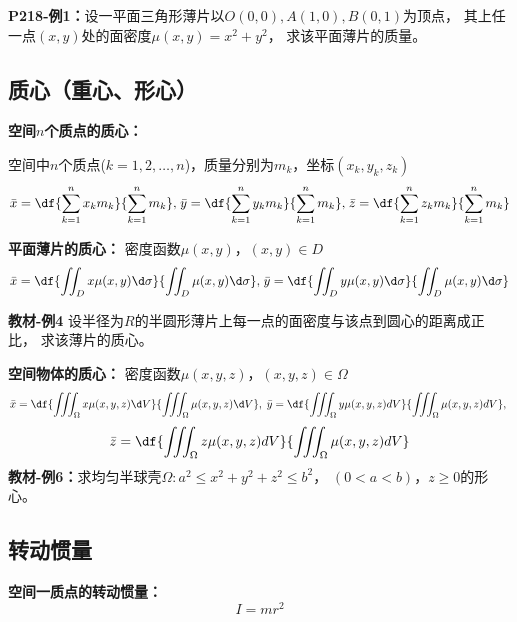 {\bf P218-例1：}设一平面三角形薄片以$O(0,0),A(1,0),B(0,1)$为顶点，
其上任一点$(x,y)$处的面密度$\mu(x,y)=x^2+y^2$，
求该平面薄片的质量。

\subsection{质心（重心、形心）}

{\bf 空间$n$个质点的质心：}
	
空间中$n$个质点($k=1,2,\ldots,n$)，质量分别为$m_k$，坐标$(x_k,y_k,z_k)$
$${\bar{x}=\df{\sum\limits_{k=1}^nx_km_k}{\sum\limits_{k=1}^nm_k},}\;
{\bar{y}=\df{\sum\limits_{k=1}^ny_km_k}{\sum\limits_{k=1}^nm_k},}\; 
{\bar{z}=\df{\sum\limits_{k=1}^nz_km_k}{\sum\limits_{k=1}^nm_k}}$$

{\bf 平面薄片的质心：} 密度函数$\mu(x,y)$，$(x,y)\in D$
$${\bar{x}=\df{\displaystyle\iint_Dx\mu(x,y)\d\sigma}
{\displaystyle\iint_D\mu(x,y)\d\sigma},\;} 
{\bar{y}=\df{\displaystyle\iint_Dy\mu(x,y)\d\sigma}
{\displaystyle\iint_D\mu(x,y)\d\sigma}}$$

{\bf 教材-例4}
设半径为$R$的半圆形薄片上每一点的面密度与该点到圆心的距离成正比，
求该薄片的质心。

{\bf 空间物体的质心：} 密度函数$\mu(x,y,z)$，$(x,y,z)\in\Omega$
$$\bar{x}=\df{\displaystyle\iiint_{\Omega}x\mu(x,y,z)\d V}
{\displaystyle\iiint_{\Omega}\mu(x,y,z)\d V},\;
{\bar{y}=\df{\displaystyle\iiint_{\Omega}y\mu(x,y,z)dV}
{\displaystyle\iiint_{\Omega}\mu(x,y,z)dV},\;} $$
$${\bar{z}=\df{\displaystyle\iiint_{\Omega}z\mu(x,y,z)dV}
{\displaystyle\iiint_{\Omega}\mu(x,y,z)dV}}
$$
{\bf 教材-例6：}求均匀半球壳$\Omega:a^2\leq x^2+y^2+z^2\leq b^2$，
$(0<a<b)$，$z\geq 0$的形心。

\subsection{转动惯量}

{\bf 空间一质点的转动惯量：}$${I=mr^2}$$

\begin{center}
\end{center}

